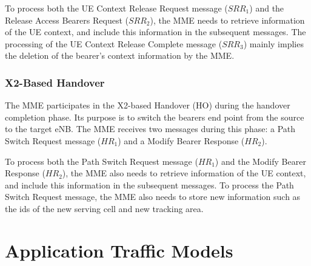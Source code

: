\documentclass[conference]{IEEEtran}
\begin{document}
To process both the UE Context Release Request message ($SRR_1$) and the Release Access Bearers Request ($SRR_2$), the MME needs to retrieve information of the UE context, and include this information in the subsequent messages. The processing of the UE Context Release Complete message ($SRR_3$) mainly implies the deletion of the bearer's context information by the MME.

\subsubsection{X2-Based Handover}
  
The MME participates in the X2-based Handover (HO) during the handover completion phase. Its purpose is to switch the bearers end point from the source to the target eNB. The MME receives two messages during this phase: a Path Switch Request message ($HR_1$) and a  Modify Bearer Response ($HR_2$).



To process both the Path Switch Request message ($HR_1$) and the Modify Bearer Response ($HR_2$), the MME also needs to retrieve information of the UE context, and include this information in the subsequent messages. To process the Path Switch Request message, the MME also needs to store new information such as the ids of the new serving cell and new tracking area.









\section{Application Traffic Models}
\label{sec:traffic-models}
\end{document}
